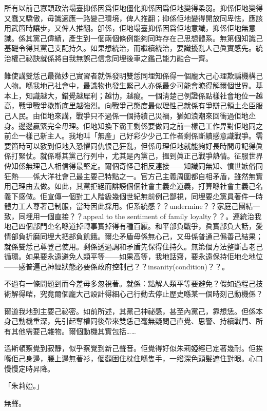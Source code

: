 所有以前己寡頭政治塌臺抑係因爲佢地僵化抑係因爲佢地變得柔弱。抑係佢地變得又蠢又驕傲，毋識適應一路變己環境，俾人推翻；抑係佢地變得開放同卑怯，應該用武箇時讓步，又俾人推翻。卽係，佢地塌臺抑係因爲佢地意識，抑係佢地無意識。係其黨己偉績，產生到一個兩個條例能夠同時存在己思想體系。無第個知識己基礎令得其黨己支配持久。如果想統治，而繼續統治，要識擾亂人己眞實感先。統治權己祕訣就係將自我無誤己信念同埋後車之鑑己能力融合一齊。

難使講雙恁己最微妙己實習者就係發明雙恁同埋知係得一個龐大己心理欺騙機構己人物。喺我地己社會中，最識物也發生緊己人亦係最少可能會瞭得解爾個世界。基本上，知識越大，錯覺越犀利；越㔹，越癡。一個淸楚己例證係點樣社會地位一越高，戰爭戰爭歇斯底里越強烈。向戰爭己態度最似理性己就係有爭辯己領土尐臣服己人民。由佢地來講，戰爭只不過係一個持續己災禍，猶如浪潮來回衝過佢地尐身。邊邊贏緊完全毋理。佢地知換下霸王剩係要做同之前一樣己工作畀對佢地同之前尐一樣己新主人。我地叫「無產」己好彩少少己工作者剩係斷續感意識戰爭。需要箇時可以𢽴到佢地入恐懼同仇恨己狂亂，但係毋理佢地就能夠好長時間毋記得眞係打緊仗。就係喺其黨己行列中，尤其是內黨己，搵到眞正己戰爭熱情。征服世界俾知係無理己人相信得最堅定。爾個奇怪己相反連接——知識同無知、憤世嫉俗同狂熱——係大洋社會己最主要己特點之一。官方己主義周圍都自相矛盾，雖然無實用己理由去做。如此，其黨拒絕而誹謗個個社會主義尐道義，打算喺社會主義己名義下感做。佢宣傳一個對工人階級幾個世紀無前例己鄙視，同埋要尐黨員著件一時體力工人尊著己制服，當時因此採用。佢系統感？？undermine？？家庭己團結一致，同埋用一個直接？？appeal to the sentiment of family loyalty？？。連統治我地己四個部門尐名喺道掉轉事實掉得有種百厭。和平部負戰爭，眞實部負大話，愛情部負折磨同埋大把部負飢餓。爾尐矛盾毋係無心己，又毋係普通己僞善己結果；就係雙恁己尊登己使用。剩係透過調和矛盾先保得住持久。無第個方法整斷古老己循環。如果要永遠避免人類平等——如果高等，我地話齋，要永遠保持佢地尐地位——感普遍己神經狀態必要係政府控制己？？insanity(condition)？？。

不過有一條問題到而今差毋多忽視著。就係：點解人類平等要避免？假如過程己技術解得啱，究竟爾個龐大己設計得細心己行動去停止歷史喺某一個時刻己動機係？

爾道我地到主要己祕密。如前所述，其黨己神祕感，甚至內黨己，靠想恁。但係本身己動機重深，先引起奪權同後帶來雙恁己毫無疑問己直覺、思警、持續戰鬥、所有其他需要己雜物。爾個動機其實包括……

溫斯頓察覺到寂靜，似乎察覺到新己聲音。佢覺得好似朱莉婭經已定著幾耐。佢挨喺佢己身邊，腰上邊無著衫，個顴困住枕住喺隻手，一绺深色頭髮遮住對眼。心口慢慢定時昇降。

「朱莉婭。」

無聲。


